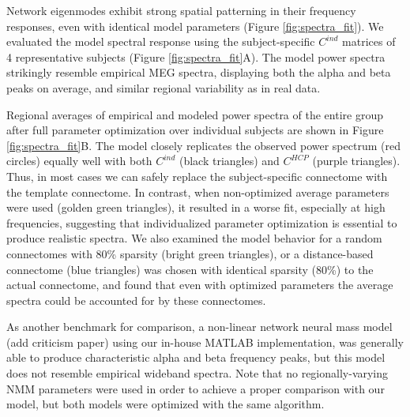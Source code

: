 Network eigenmodes exhibit strong spatial patterning in their frequency
responses, even with identical model parameters (Figure \ref{fig:spectra_fit}). We
evaluated the model spectral response using the subject-specific
$C^{ind}$ matrices of 4 representative subjects
(Figure \ref{fig:spectra_fit}A). The model power spectra strikingly
resemble empirical MEG spectra, displaying both the alpha and beta peaks
on average, and similar regional variability as in real data.

Regional averages of empirical and modeled power spectra of the entire
group after full parameter optimization over individual subjects are
shown in Figure \ref{fig:spectra_fit}B. The model closely replicates the observed
power spectrum (red circles) equally well with both $C^{ind}$
(black triangles) and $C^{HCP}$ (purple triangles). Thus, in
most cases we can safely replace the subject-specific connectome with
the template connectome. In contrast, when non-optimized average
parameters were used (golden green triangles), it resulted in a worse
fit, especially at high frequencies, suggesting that individualized
parameter optimization is essential to produce realistic spectra. We
also examined the model behavior for a random connectomes with 80\%
sparsity (bright green triangles), or a distance-based connectome (blue
triangles) was chosen with identical sparsity (80\%) to the actual
connectome, and found that even with optimized parameters the average
spectra could be accounted for by these connectomes.

As another benchmark for comparison, a non-linear network neural mass model
\cite{Wilson1972,muldoon_stimulation-based_2016} (add criticism paper) using our in-house MATLAB implementation, was generally able to produce characteristic alpha
and beta frequency peaks, but this model does not resemble empirical
wideband spectra. Note that no regionally-varying NMM parameters were
used in order to achieve a proper comparison with our model, but both
models were optimized with the same algorithm.

